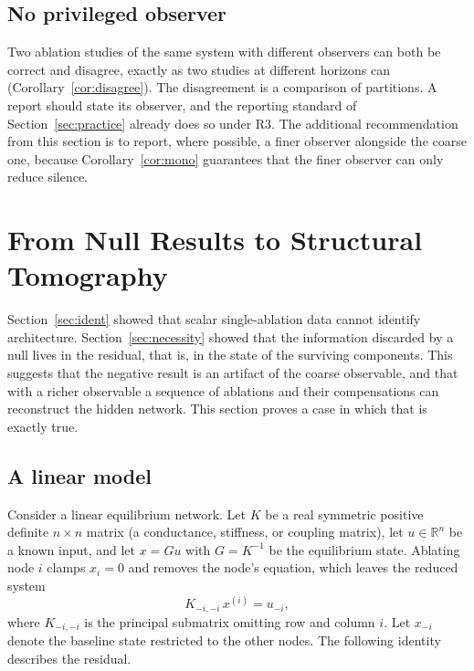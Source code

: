 \documentclass[11pt]{article}
\theoremstyle{definition}
\theoremstyle{remark}
\newcommand{\R}{\mathbb{R}}
\begin{document}
\subsection{No privileged observer}

Two ablation studies of the same system with different observers can both be correct and disagree, exactly as two studies at different horizons can (Corollary~\ref{cor:disagree}). The disagreement is a comparison of partitions. A report should state its observer, and the reporting standard of Section~\ref{sec:practice} already does so under R3. The additional recommendation from this section is to report, where possible, a finer observer alongside the coarse one, because Corollary~\ref{cor:mono} guarantees that the finer observer can only reduce silence.

\section{From Null Results to Structural Tomography}\label{sec:tomography}

Section~\ref{sec:ident} showed that scalar single-ablation data cannot identify architecture. Section~\ref{sec:necessity} showed that the information discarded by a null lives in the residual, that is, in the state of the surviving components. This suggests that the negative result is an artifact of the coarse observable, and that with a richer observable a sequence of ablations and their compensations can reconstruct the hidden network. This section proves a case in which that is exactly true.

\subsection{A linear model}

Consider a linear equilibrium network. Let $K$ be a real symmetric positive definite $n\times n$ matrix (a conductance, stiffness, or coupling matrix), let $u\in\R^n$ be a known input, and let $x=Gu$ with $G=K^{-1}$ be the equilibrium state. Ablating node $i$ clamps $x_i=0$ and removes the node's equation, which leaves the reduced system
\[
K_{-i,-i}\,x^{(i)}=u_{-i},
\]
where $K_{-i,-i}$ is the principal submatrix omitting row and column $i$. Let $x_{-i}$ denote the baseline state restricted to the other nodes. The following identity describes the residual.
\end{document}
